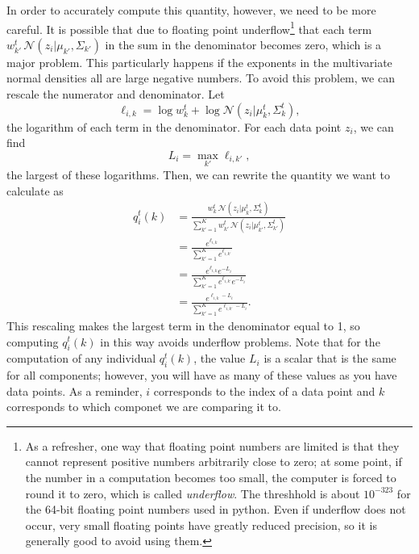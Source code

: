 In order to accurately compute this quantity, however, we need to be more careful.
It is possible that due to floating point underflow\footnote{As a refresher, one way that floating point numbers are limited is that they cannot represent positive numbers arbitrarily close to zero; at some point, if the number in a computation becomes too small, the computer is forced to round it to zero, which is called \emph{underflow}. The threshhold is about \(10^{-323}\) for the 64-bit floating point numbers used in python. Even if underflow does not occur, very small floating points have greatly reduced precision, so it is generally good to avoid using them.} that each term
\(
w_{k'}^t \,\mathcal{N}(z_i| \mu_{k'},\Sigma_{k'})
\)
in the sum in the denominator becomes zero, which is a major problem.
This particularly happens if the exponents in the multivariate normal densities all are large negative numbers.
To avoid this problem, we can rescale the numerator and denominator.
Let
\[
\ell_{i,k} = \log w_{k}^t +\log\mathcal{N}(z_i| \mu_{k}^t,\Sigma_{k}^t),\]
the logarithm of each term in the denominator.
For each data point \(z_i\), we can find
\[
L_i
=\max_{k'} \ell_{i,{k'}},
\]
the largest of these logarithms.
Then, we can rewrite the quantity we want to calculate as
\begin{align*}
q_i^t(k) &=
\frac{
w_k^t \,\mathcal{N}(z_i| \mu_k^t,\Sigma_k^t)
}{
\sum_{k'=1}^K
w_{k'}^t \,\mathcal{N}(z_i| \mu_{k'}^t,\Sigma_{k'}^t)
}
\\
&=
\frac{
e^{\ell_{i,k}}
}{
\sum_{k'=1}^K
e^{\ell_{i,k'}}
}
\\
&=
\frac{
e^{\ell_{i,k}}e^{-L_i}
}{
\sum_{k'=1}^K
e^{\ell_{i,k'}}e^{-L_i}
}
\\
&=
\frac{
e^{\ell_{i,k}-L_i}
}{
\sum_{k'=1}^K
e^{\ell_{i,k'}-L_i}
}.
\end{align*}
This rescaling makes the largest term in the denominator equal to 1, so computing \(q_i^t(k)\) in this way avoids underflow problems.
Note that for the computation of any individual \(q_i^t(k)\), the value \(L_i\) is a scalar that is the same for all components; however, you will have as many of these values as you have data points.
As a reminder, \(i\) corresponds to the index of a data point and \(k\) corresponds to which componet we are comparing it to.


